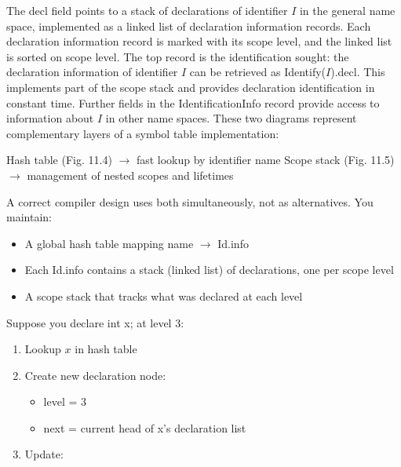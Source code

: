 \documentclass{report}
\begin{document}
\begin{itemize}
                \bigbreak \noindent 
                The decl field points to a stack of declarations of identifier $I$ in the general name space, implemented as a linked list of declaration information records. Each declaration information record is marked with its scope level, and the linked list is sorted on scope level. The top record is the identification sought: the declaration information of identifier $I$ can be retrieved as Identify($I$).decl. This implements part of the scope stack and provides declaration identification in constant time. Further fields in the IdentificationInfo record provide access to information about $I$ in other name spaces.
                \bigbreak \noindent 
                \bigbreak \noindent 
                These two diagrams represent complementary layers of a symbol table implementation:
                \begin{itemize}
                    Hash table (Fig. 11.4) $\to$ fast lookup by identifier name
                    Scope stack (Fig. 11.5) $\to$ management of nested scopes and lifetimes
                \end{itemize}
                A correct compiler design uses both simultaneously, not as alternatives.
                \bigbreak \noindent 
                You maintain:
                \begin{itemize}
                    \item A global hash table mapping name $\to$ Id.info
                    \item Each Id.info contains a stack (linked list) of declarations, one per scope level
                    \item A scope stack that tracks what was declared at each level
                \end{itemize}
                Suppose you declare int x; at level 3:
                \begin{enumerate}
                    \item Lookup $x$ in hash table
                    \item Create new declaration node:
                        \begin{itemize}
                            \item level = 3
                            \item next = current head of x’s declaration list
                        \end{itemize}
                    \item Update:

\end{enumerate}
\end{itemize}
\end{document}
